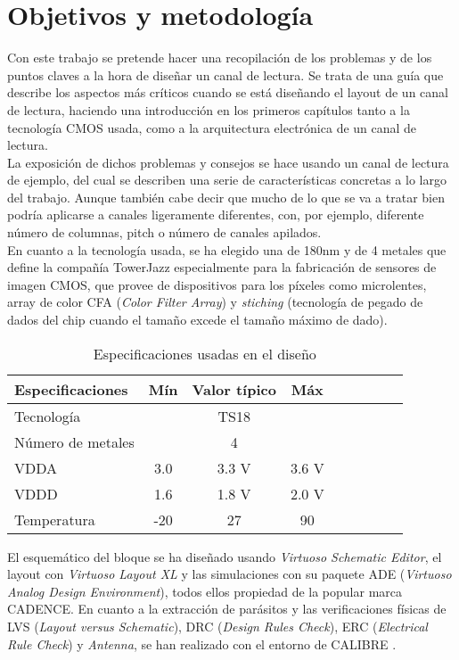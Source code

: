 \chapter*{Objetivos y metodología}
\label{cap:objetivos}

Con este trabajo se pretende hacer una recopilación de los problemas y de los
puntos claves a la hora de diseñar un canal de lectura. Se trata de una guía
que describe los aspectos más críticos cuando se está diseñando el layout de un
canal de lectura, haciendo una introducción en los primeros capítulos tanto a
la tecnología CMOS usada, como a la arquitectura electrónica de un canal de lectura.\\

La exposición de dichos problemas y consejos se hace usando un canal de lectura
de ejemplo, del cual se describen una serie de características concretas a lo
largo del trabajo. Aunque también cabe decir que mucho de lo que se va a tratar
bien podría aplicarse a canales ligeramente diferentes, con, por ejemplo,
diferente número de columnas, pitch o número de canales apilados.\\

En cuanto a la tecnología usada, se ha elegido una de 180nm y de 4 metales que
define la compañía TowerJazz\textsuperscript{\textregistered} especialmente para la fabricación de
sensores de imagen CMOS\cite{TowerJazz}, que provee de dispositivos para los
píxeles como microlentes, array de color CFA (\textit{Color Filter Array}) y \textit{stiching}
(tecnología de pegado de dados del chip cuando el tamaño excede el tamaño máximo
de dado).\\

\begin{table}[h]
	\centering
	\caption{Especificaciones usadas en el diseño}
	\label{table:specifications}
	\begin{tabular}{l*{7}{c}r}
		\hline
		Especificaciones	& Mín & Valor típico & Máx \\
		\hline
		Tecnología		&  & TS18 & \\
		Número de metales	&  & 4 & \\
		VDDA			& 3.0 & 3.3 V & 3.6 V \\
		VDDD 			& 1.6 & 1.8 V & 2.0 V \\
		Temperatura		& -20\centigrade & 27\centigrade & 90\centigrade \\
		\hline
	\end{tabular}
\end{table}

El esquemático del bloque se ha diseñado usando \textit{Virtuoso Schematic Editor}\cite{VirtuosoSchematic},
el layout con \textit{Virtuoso Layout XL}\cite{VirtuosoLayoutXL} y las
simulaciones con su paquete ADE (\textit{Virtuoso Analog Design Environment}), todos
ellos propiedad de la popular marca CADENCE\textsuperscript{\textregistered}.
En cuanto a la extracción de parásitos y las verificaciones físicas de LVS
(\textit{Layout versus Schematic}), DRC (\textit{Design Rules Check}), ERC
(\textit{Electrical Rule Check}) y \textit{Antenna}, se han realizado con el entorno
de CALIBRE\textsuperscript{\textregistered} \cite{Calibre}.
